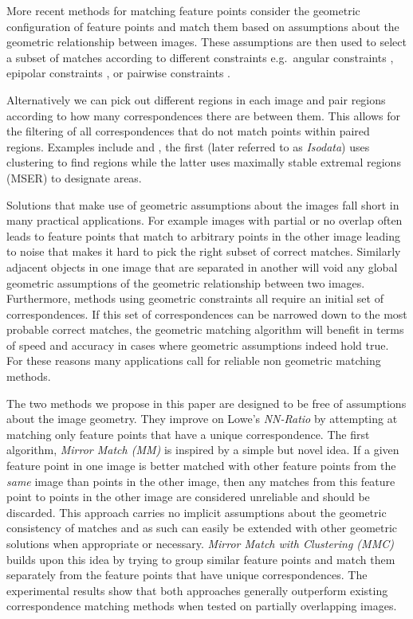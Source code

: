 \documentclass[conference]{IEEEtran}
\begin{document}
More recent methods for matching feature points consider the geometric 
configuration of feature points and match them based on assumptions 
about the geometric relationship between images.  These assumptions are 
then used to select a subset of matches according to different 
constraints e.g.\ angular constraints \cite{kim2008efficient}, epipolar 
constraints \cite{torr2000mlesac,chum2005matching}, or pairwise 
constraints \cite{choi2009robust,leordeanu2005spectral}.

Alternatively we can pick out different regions in each image and pair 
regions according to how many correspondences there are between them.  
This allows for the filtering of all correspondences that do not match 
points within paired regions.  Examples include \cite{das2008event} and 
\cite{wu2011robust}, the first (later referred to as \emph{Isodata}) 
uses clustering to find regions while the latter uses maximally stable 
extremal regions (MSER) to designate areas.

Solutions that make use of geometric assumptions about the images fall 
short in many practical applications. For example images with partial or 
no overlap often leads to feature points that match to arbitrary points 
in the other image leading to noise that makes it hard to pick the right 
subset of correct matches. Similarly adjacent objects in one image that 
are separated in another will void any global geometric assumptions of 
the geometric relationship between two images.  Furthermore, methods 
using geometric constraints all require an initial set of 
correspondences. If this set of correspondences can be narrowed down to 
the most probable correct matches, the geometric matching algorithm will 
benefit in terms of speed and accuracy in cases where geometric 
assumptions indeed hold true. For these reasons many applications call 
for reliable non geometric matching methods.

The two methods we propose in this paper are designed to be free of 
assumptions about the image geometry. They improve on Lowe's 
\emph{NN-Ratio} by attempting at matching only feature points that have 
a unique correspondence. The first algorithm, \emph{Mirror Match (MM)} 
is inspired by a simple but novel idea.  If a given feature point in one 
image is better matched with other feature points from the \emph{same} 
image than points in the other image, then any matches from this feature 
point to points in the other image are considered unreliable and should 
be discarded.  This approach carries no implicit assumptions about the 
geometric consistency of matches and as such can easily be extended with 
other geometric solutions when appropriate or necessary. \emph{Mirror 
Match with Clustering (MMC)} builds upon this idea by trying to group 
similar feature points and match them separately from the feature points 
that have unique correspondences. The experimental results show that 
both approaches generally outperform existing correspondence matching 
methods when tested on partially overlapping images.
\end{document}
